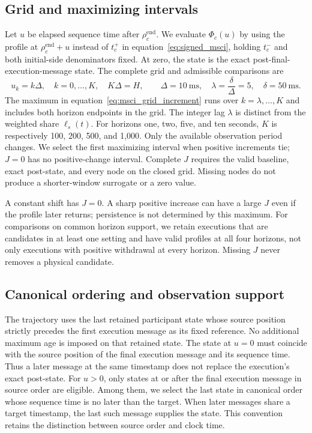 \subsection{Grid and maximizing intervals}
Let $u$ be elapsed sequence time after $\rho_c^{\mathrm{end}}$. We evaluate $\Phi_c(u)$ by using the profile at $\rho_c^{\mathrm{end}}+u$ instead of $t_c^+$ in equation~\eqref{eq:signed_msci}, holding $t_c^-$ and both initial-side denominators fixed. At zero, the state is the exact post-final-execution-message state. The complete grid and admissible comparisons are
\begin{equation}
    u_k=k\Delta,\quad k=0,\ldots,K,\quad K\Delta=H,
    \qquad \Delta=10\ \mathrm{ms},\quad
    \lambda=\frac{\delta}{\Delta}=5,\quad\delta=50\ \mathrm{ms}.
    \label{eq:profile_grid_definition}
\end{equation}
The maximum in equation~\eqref{eq:msci_grid_increment} runs over $k=\lambda,\ldots,K$ and includes both horizon endpoints in the grid. The integer lag $\lambda$ is distinct from the weighted share $\ell_s(t)$. For horizons one, two, five, and ten seconds, $K$ is respectively 100, 200, 500, and 1,000. Only the available observation period changes. We select the first maximizing interval when positive increments tie; $J=0$ has no positive-change interval. Complete $J$ requires the valid baseline, exact post-state, and every node on the closed grid. Missing nodes do not produce a shorter-window surrogate or a zero value.

A constant shift has $J=0$. A sharp positive increase can have a large $J$ even if the profile later returns; persistence is not determined by this maximum. For comparisons on common horizon support, we retain executions that are candidates in at least one setting and have valid profiles at all four horizons, not only executions with positive withdrawal at every horizon. Missing $J$ never removes a physical candidate.

\subsection{Canonical ordering and observation support}
\label{subsec:msci_grid_support}
The trajectory uses the last retained participant state whose source position strictly precedes the first execution message as its fixed reference. No additional maximum age is imposed on that retained state. The state at $u=0$ must coincide with the source position of the final execution message and its sequence time. Thus a later message at the same timestamp does not replace the execution's exact post-state. For $u>0$, only states at or after the final execution message in source order are eligible. Among them, we select the last state in canonical order whose sequence time is no later than the target. When later messages share a target timestamp, the last such message supplies the state. This convention retains the distinction between source order and clock time.

